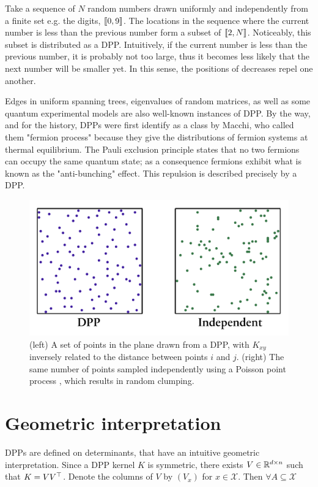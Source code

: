 Take a sequence of $N$ random numbers drawn uniformly and independently from a finite set e.g. the digits, $\llbracket 0,9 \rrbracket$. The locations in the sequence where the current number is less than the previous number form a subset of  $\llbracket 2,N \rrbracket$. Noticeably, this subset is distributed as a DPP. Intuitively, if the current number is less than the previous number, it is probably not too large, thus it becomes less likely that the next number will be smaller yet. In this sense, the positions of decreases repel one another.

Edges in uniform spanning trees, eigenvalues of random matrices, as well as some quantum experimental models are also well-known instances of DPP. By the way, and for the history, DPPs were first identify as a class by Macchi, who called them "fermion process" because they give the distributions of fermion systems at thermal equilibrium. The Pauli exclusion principle states that no two fermions can occupy the same quantum state; as a consequence fermions exhibit what is known as the "anti-bunching" effect. This repulsion is described precisely by a DPP.

\begin{figure}[!ht]
    \centering
    \includegraphics[width=0.6\linewidth]{pics/dpp_vs_iid.png}
    \caption{(left) A set of points in the plane drawn from a DPP, with $K_{x y}$ inversely related to the distance between points $i$ and $j$. (right) The same number of points sampled independently using a Poisson point process , which results in random clumping.}
    \label{fig_dpp_vs_iid}
\end{figure}



\section{Geometric interpretation}
DPPs are defined on determinants, that have an intuitive geometric interpretation. Since a DPP kernel $K$ is symmetric, there exists $V \in \mathbb{R}^{d \times n}$ such that $K= V V^\top$. 
Denote the columns of $V$ by $(V_x)$ for $x\in \mathcal{X}$. Then $\forall A \subseteq \mathcal{X}$

